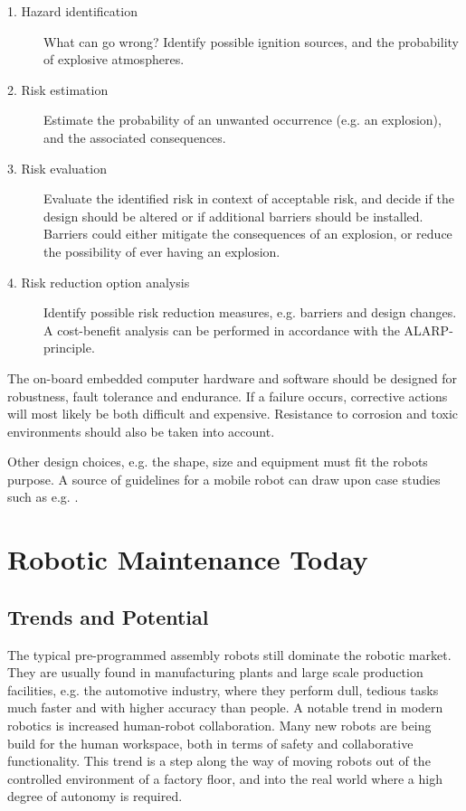 \begin{description}
\item[1. Hazard identification \-] What can go wrong? Identify possible ignition sources, and the probability of explosive atmospheres.
\item[2. Risk estimation \-] Estimate the probability of an unwanted occurrence (e.g. an explosion), and the associated consequences.
\item[3. Risk evaluation \-] Evaluate the identified risk in context of acceptable risk, and decide if the design should be altered or if additional barriers should be installed. Barriers could either mitigate the consequences of an explosion, or reduce the possibility of ever having an explosion.
\item[4. Risk reduction option analysis \-] Identify possible risk reduction measures, e.g. barriers and design changes. A cost-benefit analysis can be performed in accordance with the ALARP-principle. 
\end{description}

The on-board embedded computer hardware and software should be designed for robustness, fault tolerance and endurance. If a failure occurs, corrective actions will most likely be both difficult and expensive. Resistance to corrosion and toxic environments should also be taken into account.

Other design choices, e.g. the shape, size and equipment must fit the robots purpose. A source of guidelines for a mobile robot can draw upon case studies such as e.g. \cite{graf2008mobile}.

\section{Robotic Maintenance Today}
 
\subsection{Trends and Potential}
 
The typical pre-programmed assembly robots still dominate the robotic market. They are usually found in manufacturing plants and large scale production facilities\cite{ifr_statistics}, e.g. the automotive industry, where they perform dull, tedious tasks much faster and with higher accuracy than people. A notable trend in modern robotics is increased human-robot collaboration\cite{cobotsEurope}. Many new robots are being build for the human workspace, both in terms of safety and collaborative functionality. This trend is a step along the way of moving robots out of the controlled environment of a factory floor, and into the real world where a high degree of autonomy is required.

